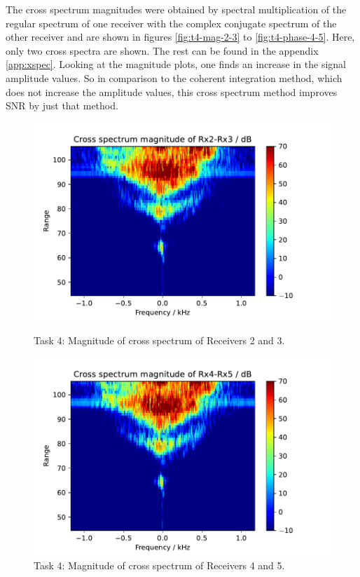 The cross spectrum magnitudes were obtained by spectral multiplication of the regular spectrum of one receiver with the complex conjugate spectrum of the other receiver and are shown in figures \ref{fig:t4-mag-2-3} to \ref{fig:t4-phase-4-5}.
Here, only two cross spectra are shown. The rest can be found in the appendix \ref{app:xspec}. Looking at the magnitude plots, one finds an increase in the signal amplitude values. So in comparison to the coherent integration method, which does not increase the amplitude values, this cross spectrum method improves SNR by just that method.\\


\begin{figure}
    \centering
    \begin{minipage}{0.48\textwidth}
        \centering
        \includegraphics[width=\textwidth]{graphics/t4/t4-mag-2-3.pdf}
    \caption{Task 4: Magnitude of cross spectrum of Receivers 2 and 3.}
    \label{fig:t4-mag-2-3}
    \end{minipage}\hfill
    \begin{minipage}{0.48\textwidth}
        \centering
             \includegraphics[width=\textwidth]{graphics/t4/t4-mag-4-5.pdf}
    \caption{Task 4: Magnitude of cross spectrum of Receivers 4 and 5.}
    \label{fig:t4-mag-4-5}
    \end{minipage}
\end{figure}

